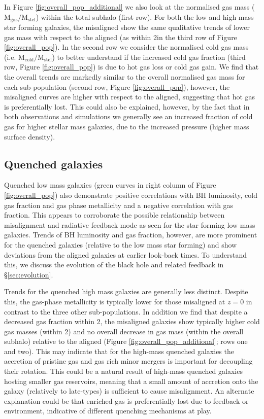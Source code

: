 In Figure \ref{fig:overall_pop_additional} we also look at the normalised gas mass ($\mathrm{M_{gas} / M_{stel}}$) within the total subhalo (first row). For both the low and high mass star forming galaxies, the misaligned show the same qualitative trends of lower gas mass with respect to the aligned (as within 2\re in the third row of Figure \ref{fig:overall_pop}). In the second row we consider the normalised cold gas mass (i.e. $\mathrm{M_{cold} / M_{stel}}$) to better understand if the increased cold gas fraction (third row, Figure \ref{fig:overall_pop}) is due to hot gas loss or cold gas gain. We find that the overall trends are markedly similar to the overall normalised gas mass for each sub-population (second row, Figure \ref{fig:overall_pop}), however, the misaligned curves are higher with respect to the aligned, suggesting that hot gas is preferentially lost. This could also be explained, however, by the fact that in both observations and simulations we generally see an increased fraction of cold gas for higher stellar mass galaxies, due to the increased pressure (higher mass surface density).

\subsection{Quenched galaxies}
Quenched low mass galaxies (green curves in right column of Figure \ref{fig:overall_pop}) also demonstrate positive correlations with BH luminosity, cold gas fraction and gas phase metallicity and a negative correlation with gas fraction. This appears to corroborate the possible relationship between misalignment and radiative feedback mode as seen for the star forming low mass galaxies. Trends of BH luminosity and gas fraction, however, are more prominent for the quenched galaxies (relative to the low mass star forming) and show deviations from the aligned galaxies at earlier look-back times. To understand this, we discuss the evolution of the black hole and related feedback in \S\ref{sec:evolution}.

Trends for the quenched high mass galaxies are generally less distinct. Despite this, the gas-phase metallicity is typically lower for those misaligned at $z=0$ in contrast to the three other sub-populations. In addition we find that despite a decreased gas fraction within 2\re, the misaligned galaxies show typically higher cold gas masses (within 2\re) and no overall decrease in gas mass (within the overall subhalo) relative to the aligned (Figure \ref{fig:overall_pop_additional}; rows one and two). This may indicate that for the high-mass quenched galaxies the accretion of pristine gas and gas rich minor mergers is important for decoupling their rotation. This could be a natural result of high-mass quenched galaxies hosting smaller gas reservoirs, meaning that a small amount of accretion onto the galaxy (relatively to late-types) is sufficient to cause misalignment. An alternate explanation could be that enriched gas is preferentially lost due to feedback or environment, indicative of different quenching mechanisms at play.

